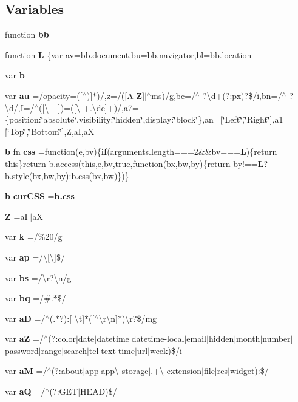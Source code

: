 \subsection*{Variables}
\begin{DoxyCompactItemize}
\item 
function {\bf bb}
\item 
function {\bf L} \{var av=bb.\-document,bu=bb.\-navigator,bl=bb.\-location
\item 
var {\bf b}
\item 
var {\bf au} =/opacity=([$^\wedge$)]$\ast$)/,z=/([A-\/{\bf Z}]$\vert$$^\wedge$ms)/g,bc=/$^\wedge$-\/?\textbackslash{}d+(?\-:px)?\$/i,bn=/$^\wedge$-\/?\textbackslash{}d/,I=/$^\wedge$([\textbackslash{}-\/+])=([\textbackslash{}-\/+.\textbackslash{}de]+)/,a7=\{position\-:\char`\"{}absolute\char`\"{},visibility\-:\char`\"{}hidden\char`\"{},display\-:\char`\"{}block\char`\"{}\},an=[\char`\"{}Left\char`\"{},\char`\"{}Right\char`\"{}],a1=[\char`\"{}Top\char`\"{},\char`\"{}Bottom\char`\"{}],Z,a\-I,a\-X
\item 
{\bf b} fn {\bf css} =function(e,bv)\{{\bf if}(arguments.\-length===2\&\&bv==={\bf L})\{return this\}return b.\-access(this,e,bv,true,function(bx,bw,by)\{return by!=={\bf L}?b.\-style(bx,bw,by)\-:b.\-css(bx,bw)\})\}
\item 
{\bf b} {\bf cur\-C\-S\-S} ={\bf b.\-css}
\item 
{\bf Z} =a\-I$\vert$$\vert$a\-X
\item 
var {\bf k} =/\%20/g
\item 
var {\bf ap} =/\textbackslash{}[\textbackslash{}]\$/
\item 
var {\bf bs} =/\textbackslash{}r?\textbackslash{}n/g
\item 
var {\bf bq} =/\#.$\ast$\$/
\item 
var {\bf a\-D} =/$^\wedge$(.$\ast$?)\-:[ \textbackslash{}t]$\ast$([$^\wedge$\textbackslash{}r\textbackslash{}n]$\ast$)\textbackslash{}r?\$/mg
\item 
var {\bf a\-Z} =/$^\wedge$(?\-:color$\vert$date$\vert$datetime$\vert$datetime-\/local$\vert$email$\vert$hidden$\vert$month$\vert$number$\vert$password$\vert$range$\vert$search$\vert$tel$\vert$text$\vert$time$\vert$url$\vert$week)\$/i
\item 
var {\bf a\-M} =/$^\wedge$(?\-:about$\vert$app$\vert$app\textbackslash{}-\/storage$\vert$.+\textbackslash{}-\/extension$\vert$file$\vert$res$\vert$widget)\-:\$/
\item 
var {\bf a\-Q} =/$^\wedge$(?\-:G\-E\-T$\vert$H\-E\-A\-D)\$/

\end{DoxyCompactItemize}
